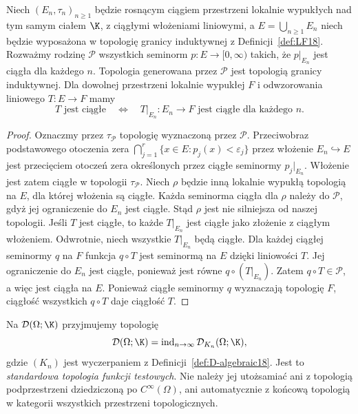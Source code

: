 \begin{twierdzenie}
\label{thm:LF-universal18}
Niech $(E_n,\tau_n)_{n\ge1}$ będzie rosnącym ciągiem
przestrzeni lokalnie wypukłych nad tym samym ciałem $\K$,
z ciągłymi włożeniami liniowymi, a $E=\bigcup_{n\ge1}E_n$
niech będzie wyposażona w topologię granicy induktywnej
z Definicji~\ref{def:LF18}. Rozważmy rodzinę
$\mathcal P$ wszystkich seminorm $p:E\to[0,\infty)$ takich,
że $p|_{E_n}$ jest ciągła dla każdego $n$.
Topologia generowana przez $\mathcal P$ jest topologią
granicy induktywnej. Dla dowolnej przestrzeni lokalnie
wypukłej $F$ i odwzorowania liniowego $T:E\to F$ mamy
\[
 T\text{ jest ciągłe}\quad\Longleftrightarrow\quad
 T|_{E_n}:E_n\to F\text{ jest ciągłe dla każdego }n.
\]
\end{twierdzenie}
\begin{proof}
Oznaczmy przez $\tau_{\mathcal P}$ topologię wyznaczoną przez
$\mathcal P$. Przeciwobraz podstawowego otoczenia zera
$\bigcap_{j=1}^r\{x\in E:p_j(x)<\varepsilon_j\}$
przez włożenie $E_n\hookrightarrow E$ jest przecięciem
otoczeń zera określonych przez ciągłe seminormy $p_j|_{E_n}$.
Włożenie jest zatem ciągłe w topologii $\tau_{\mathcal P}$. Niech $\rho$ będzie
inną lokalnie wypukłą topologią na $E$, dla której włożenia
są ciągłe. Każda seminorma ciągła dla $\rho$ należy do
$\mathcal P$, gdyż jej ograniczenie do $E_n$ jest ciągłe.
Stąd $\rho$ jest nie silniejsza od naszej topologii.
Jeśli $T$ jest ciągłe, to każde $T|_{E_n}$ jest ciągłe
jako złożenie z ciągłym włożeniem.
Odwrotnie, niech wszystkie $T|_{E_n}$ będą ciągłe.
Dla każdej ciągłej seminormy $q$ na $F$ funkcja $q\circ T$
jest seminormą na $E$ dzięki liniowości $T$.
Jej ograniczenie do $E_n$ jest ciągłe, ponieważ jest równe
$q\circ(T|_{E_n})$. Zatem $q\circ T\in\mathcal P$,
a więc jest ciągła na $E$. Ponieważ ciągłe seminormy $q$
wyznaczają topologię $F$, ciągłość wszystkich $q\circ T$
daje ciągłość $T$.
\end{proof}

\begin{definicja}
\label{def:D-LF18}
Na $\mathcal D(\Omega;\K)$ przyjmujemy topologię
\[
 \mathcal D(\Omega;\K)
   =\operatorname{ind}_{n\to\infty}\mathcal D_{K_n}(\Omega;\K),
\]
gdzie $(K_n)$ jest wyczerpaniem z
Definicji~\ref{def:D-algebraic18}. Jest to \emph{standardowa
topologia funkcji testowych}. Nie należy jej utożsamiać
ani z topologią podprzestrzeni dziedziczoną po
$C^\infty(\Omega)$, ani automatycznie z końcową topologią
w kategorii wszystkich przestrzeni topologicznych.
\end{definicja}

